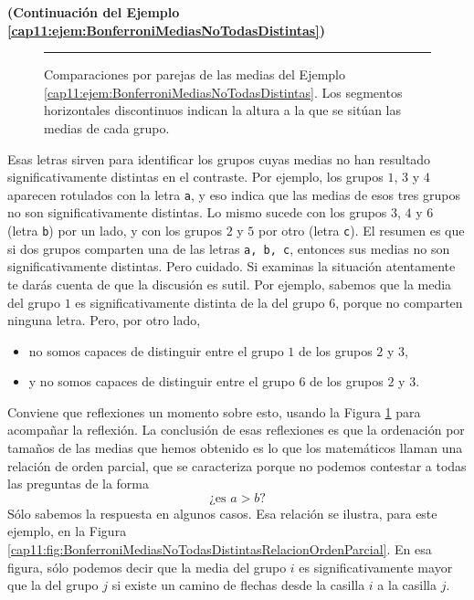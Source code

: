 \begin{ejemplo}{\bf (Continuación del Ejemplo \ref{cap11:ejem:BonferroniMediasNoTodasDistintas})}
\begin{figure}[htbp]
\begin{center}
\begin{bn}
\hrule
\end{bn}
\caption{Comparaciones por parejas de las medias del Ejemplo \ref{cap11:ejem:BonferroniMediasNoTodasDistintas}. Los segmentos horizontales discontinuos indican la altura a la que se sitúan las medias de cada grupo.}
\label{cap11:fig:BonferroniMediasNoTodasDistintasBoxplotsGrupos}
\end{center}
\end{figure}

Esas letras sirven para identificar los grupos cuyas medias no han resultado significativamente
distintas en el contraste. Por ejemplo, los grupos $1$, $3$ y $4$ aparecen rotulados con la letra
{\tt a}, y eso indica que las medias de esos tres grupos no son significativamente distintas. Lo
mismo sucede con los grupos $3$, $4$ y $6$ (letra {\tt b}) por un lado, y con los grupos $2$ y $5$
por otro (letra {\tt c}). El resumen es que si dos grupos comparten una de las letras {\tt a, b, c}, entonces sus medias no son significativamente distintas.
Pero cuidado. Si examinas la situación atentamente te darás cuenta de que la discusión es sutil.
Por ejemplo, sabemos que la media del grupo $1$ es significativamente distinta de la del grupo $6$,
porque no comparten ninguna letra. Pero, por otro lado,
\begin{itemize}
  \item no somos capaces de distinguir entre el grupo $1$ de los grupos $2$ y $3$,
  \item y no somos capaces de distinguir entre el grupo $6$ de los grupos $2$ y $3$.
\end{itemize}
Conviene que reflexiones un momento sobre esto, usando la Figura
\ref{cap11:fig:BonferroniMediasNoTodasDistintasBoxplotsGrupos} para acompañar la reflexión.
La conclusión de esas reflexiones es que la ordenación por tamaños de las medias que hemos obtenido
es lo que los matemáticos llaman una {\sf relación de orden parcial}, que se caracteriza porque no podemos contestar a todas las
preguntas de la forma
\[\mbox{¿es $a > b$?}\]
Sólo sabemos la respuesta en algunos casos. Esa relación se ilustra, para este ejemplo, en la
Figura \ref{cap11:fig:BonferroniMediasNoTodasDistintasRelacionOrdenParcial}. En esa figura, sólo
podemos decir que la media del grupo $i$ es significativamente mayor que la del grupo $j$ si existe
un camino de flechas desde la casilla $i$ a la casilla $j$.


\end{ejemplo}
